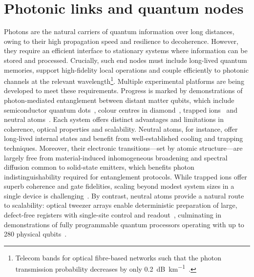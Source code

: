 \documentclass[../Thesis-IJspeert.tex]{subfiles}
\begin{document}
\section{Photonic links and quantum nodes}
Photons are the natural carriers of quantum information over long distances, owing to their high propagation speed and resilience to decoherence. However, they require an efficient interface to stationary systems where information can be stored and processed. Crucially, such end nodes must include long-lived quantum memories, support high-fidelity local operations and couple efficiently to photonic channels at the relevant wavelength\footnote{Telecom bands for optical fibre-based networks such that the photon transmission probability decreases by only \SI{0.2}{\deci B\per\kilo\meter}~\cite{Lines1984}.}. Multiple experimental platforms are being developed to meet these requirements. Progress is marked by demonstrations of photon-mediated entanglement between distant matter qubits, which include semiconductor quantum dots~\cite{Delteil2016,Stockill2017}, colour centres in diamond~\cite{Bernien2013}, trapped ions~\cite{Moehring2007,Blatt2008} and neutral atoms~\cite{rempe2012,Hofmann2012,vanLeent2022}. Each system offers distinct advantages and limitations in coherence, optical properties and scalability. Neutral atoms, for instance, offer long-lived internal states and benefit from well-established cooling and trapping techniques. Moreover, their electronic transitions---set by atomic structure---are largely free from material-induced inhomogeneous broadening and spectral diffusion common to solid-state emitters, which benefits photon indistinguishability required for entanglement protocols. While trapped ions offer superb coherence and gate fidelities, scaling beyond modest system sizes in a single device is challenging~\cite{Kielpinski2002}. By contrast, neutral atoms provide a natural route to scalability: optical tweezer arrays enable deterministic preparation of large, defect-free registers with single-site control and readout~\cite{Manetsch2024}, culminating in demonstrations of fully programmable quantum processors operating with up to \num{280} physical qubits~\cite{Bluvstein2023}.
\end{document}
